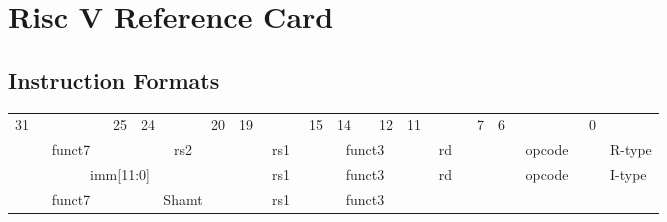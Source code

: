 \vspace*{-2cm}
\section*{Risc V Reference Card}

\subsection*{Instruction Formats}
    \begin{table}[h]
        \scriptsize
        \begin{tabular} %
            {p{0.01mm}p{0.01mm}p{0.01mm}p{0.01mm} p{0.01mm}p{0.01mm}p{0.01mm}p{0.01mm}
             p{0.01mm}p{0.01mm}p{0.01mm}p{0.01mm} p{0.01mm}p{0.01mm}p{0.01mm}p{0.01mm}
             p{0.01mm}p{0.01mm}p{0.01mm}p{0.01mm} p{0.01mm}p{0.01mm}p{0.01mm}p{0.01mm}
             p{0.01mm}p{0.01mm}p{0.01mm}p{0.01mm} p{0.01mm}p{0.01mm}p{0.01mm}p{0.01mm} l}
            \multicolumn{1}{c}{31}&&&&&&
            \multicolumn{1}{c}{25}&
            \multicolumn{1}{c}{24}&&&&
            \multicolumn{1}{c}{20}&
            \multicolumn{1}{c}{19}&&&&
            \multicolumn{1}{c}{15}&
            \multicolumn{1}{c}{14}&&
            \multicolumn{1}{c}{12}&
            \multicolumn{1}{c}{11}&&&&
            \multicolumn{1}{c}{7}&
            \multicolumn{1}{c}{6}&&&&&&
            \multicolumn{1}{c}{0}&
            \\
            \cline{0-31} 
            \multicolumn{7}{|c|}{funct7} &
            \multicolumn{5}{c|}{rs2}&
            \multicolumn{5}{c|}{rs1}&
            \multicolumn{3}{c|}{funct3}&
            \multicolumn{5}{c|}{rd}&
            \multicolumn{7}{c|}{opcode}&
            R-type
            \\
            \cline{0-31} 
            \multicolumn{12}{|c|}{imm[11:0]} &
            \multicolumn{5}{c|}{rs1}&
            \multicolumn{3}{c|}{funct3}&
            \multicolumn{5}{c|}{rd}&
            \multicolumn{7}{c|}{opcode}&
            I-type
            \\
            \cline{0-31} 
            \multicolumn{7}{|c|}{funct7} &
            \multicolumn{5}{c|}{Shamt}&
            \multicolumn{5}{c|}{rs1}&
            \multicolumn{3}{c|}{funct3}&

\end{tabular}
\end{table}
